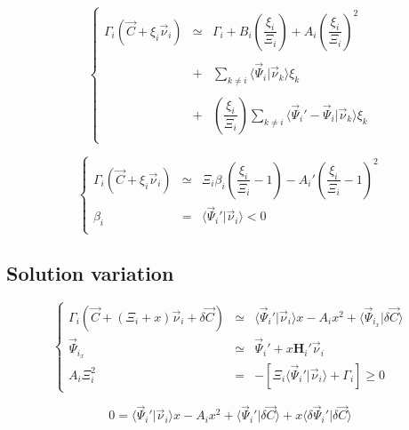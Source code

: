 \documentclass[aps,12pt]{revtex4}
\begin{document}
\begin{equation}
\left\lbrace
\begin{array}{rcl}
	\Gamma_i(\vec{C} + \xi_i \vec{\nu}_i) & \simeq &
	\Gamma_i + B_i \left(\dfrac{\xi_i}{\Xi_i}\right) + A_i \left(\dfrac{\xi_i}{\Xi_i}\right)^2 \\
	\\
	& + & \displaystyle \sum_{k\not=i} \langle \vec{\Psi}_i \vert \vec{\nu}_k \rangle \xi_k \\
	\\
	& + & \displaystyle \left(\dfrac{\xi_i}{\Xi_i}\right) \sum_{k\not=i} \langle \vec{\Psi}_i'-\vec{\Psi}_i \vert \vec{\nu}_k \rangle \xi_k\\
\end{array}
\right.
\end{equation}


\begin{equation}
\left\lbrace
\begin{array}{rcl}
	\Gamma_i(\vec{C} + \xi_i \vec{\nu}_i) & \simeq & \Xi_i \beta_i \left(\dfrac{\xi_i}{\Xi_i}-1\right) - A_i' \left(\dfrac{\xi_i}{\Xi_i}-1\right)^2\\
	\beta_i        & = & \langle \vec{\Psi}_i' \vert \vec{\nu}_i \rangle < 0\\
\end{array}
\right.
\end{equation}

\subsection{Solution variation}

\begin{equation}
\left\lbrace
\begin{array}{rcl}
	\Gamma_i(\vec{C}+(\Xi_i+x)\vec{\nu}_i + \delta\vec{C}) & \simeq & \langle \vec{\Psi}_i' \vert \vec{\nu}_i \rangle x - A_i x^2 
	+ \langle \vec{\Psi}_{i_x} \vert \delta\vec{C} \rangle\\
	\vec{\Psi}_{i_x} & \simeq & \vec{\Psi}_i' + x \bm{H}_i' \vec{\nu}_i \\
	A_i \Xi_i^2 & = & -\left[ \Xi_i \langle \vec{\Psi}_i' \vert \vec{\nu}_i \rangle + \Gamma_i \right] \geq 0
\end{array}
\right.
\end{equation}

\begin{equation}
	0 = \langle \vec{\Psi}_i' \vert \vec{\nu}_i \rangle x - A_i x^2 
	+ \langle \vec{\Psi}_i' \vert \delta\vec{C} \rangle + x \langle \delta \vec{\Psi}_i' \vert \delta\vec{C} \rangle
\end{equation}
\end{document}
